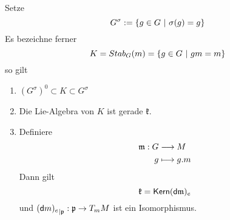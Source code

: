 \documentclass{book}
\renewcommand{\d}{\textsf{d}}
\newcommand{\kf}{\mathfrak{k}}
\newcommand{\p}{\mathfrak{p}}
\newcommand{\m}{\mathfrak{m}}
\begin{document}

\Prop{}
Setze
\[G^\sigma := \set{ g \in G }{\sigma(g) = g}\]
Es bezeichne ferner
\[ K = Stab_G(m) = \set{g \in G}{gm = m} \]
so gilt
\begin{enumerate}[1.)]
\item $(G^\sigma)^0 \subset K \subset G^\sigma$
\item Die Lie-Algebra von $K$ ist gerade $\kf$.
\item Definiere
\begin{align*}
\m : G & \Pfeil{} M\\
g & \longmapsto g.m
\end{align*}
Dann gilt
\[ \kf = \Ker (\d \m)_e \]
und ${(\d m)_e}_{|\p} : \p \pfeil{} T_m M$ ist ein Isomorphismus.
\end{enumerate}
\end{document}
